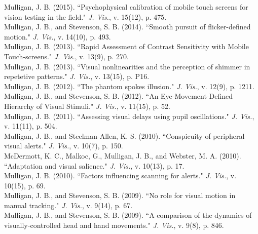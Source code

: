 \documentclass[12pt]{article}
\newcommand{\years}[1]{\marginnote{\scriptsize #1}}
\begin{document}
\years{2015}
Mulligan, J. B. (2015).
``Psychophysical calibration of mobile touch screens for vision testing in the field."
\emph{J. Vis.}, v. 15(12), p. 475.\\

\years{2014}
Mulligan, J. B., and Stevenson, S. B. (2014).
``Smooth pursuit of flicker-defined motion."
\emph{J. Vis.}, v. 14(10), p. 493.\\

\years{2013}
Mulligan, J. B. (2013).
``Rapid Assessment of Contrast Sensitivity with Mobile Touch-screens."
\emph{J. Vis.}, v. 13(9), p. 270.\\

Mulligan, J. B. (2013).
``Visual nonlinearities and the perception of shimmer in repetetive patterns."
\emph{J. Vis.}, v. 13(15), p. P16.\\

\years{2012}
Mulligan, J. B. (2012).
``The phantom spokes illusion."
\emph{J. Vis.}, v. 12(9), p. 1211.\\

Mulligan, J. B., and Stevenson, S. B. (2012).
``An Eye-Movement-Defined Hierarchy of Visual Stimuli."
\emph{J. Vis.}, v. 11(15), p. 52.\\

\years{2011}
Mulligan, J. B. (2011).
``Assessing visual delays using pupil oscillations."
\emph{J. Vis.}, v. 11(11), p. 504.\\


\years{2010}
Mulligan, J. B., and Steelman-Allen, K. S. (2010).
``Conspicuity of peripheral visual alerts."
\emph{J. Vis.}, v. 10(7), p. 150.\\

McDermott, K. C., Malkoc, G., Mulligan, J. B., and Webster, M. A. (2010).
``Adaptation and visual salience."
\emph{J. Vis.}, v. 10(13), p. 17.\\

Mulligan, J. B. (2010).
``Factors influencing scanning for alerts."
\emph{J. Vis.}, v. 10(15), p. 69.\\

\years{2009}
Mulligan, J. B., and Stevenson, S. B. (2009).
``No role for visual motion in manual tracking."
\emph{J. Vis.}, v. 9(14), p. 67.\\

Mulligan, J. B., and Stevenson, S. B. (2009).
``A comparison of the dynamics of visually-controlled head and hand movements."
\emph{J. Vis.}, v. 9(8), p. 846.\\
\end{document}
